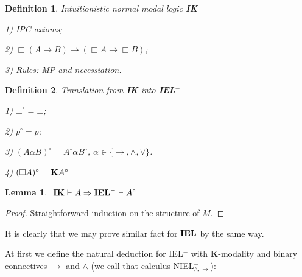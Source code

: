 \documentclass[a4paper]{article}
\newtheorem{lemma}{Lemma}
\newtheorem{defin}{Definition}
\begin{document}
  \begin{defin} Intuitionistic normal modal logic {\bf IK}

    1) IPC axioms;

    2) $\Box (A \to B) \to (\Box A \to \Box B)$;

    3) Rules: MP and necessiation.

  \end{defin}

  \begin{defin} Translation from {\bf IK} into {\bf IEL}$^{-}$

    1) $\bot^{\circ} = \bot$;

    2) $p^{\circ} = p$;

    3) $(A \alpha B)^{\circ} = A^{\circ} \alpha B^{\circ}$, $\alpha \in \{ \to, \wedge, \vee \}$.

    4) $(\Box A)^{\circ} = {\bf K} A^{\circ}$
  \end{defin}

  \begin{lemma}
    $ $
    ${\bf IK} \vdash A \Rightarrow {\bf IEL}^{-} \vdash A^{\circ}$
  \end{lemma}

  \begin{proof}
    Straightforward induction on the structure of $M$.
  \end{proof}

  It is clearly that we may prove similar fact for ${\bf IEL}$ by the same way.

  At first we define the natural deduction for IEL$^{-}$ with $\textbf{K}$-modality and binary connectives
  $\to$ and $\land$ (we call that calculus NIEL$^{-}_{\land, \to}$):
\end{document}
